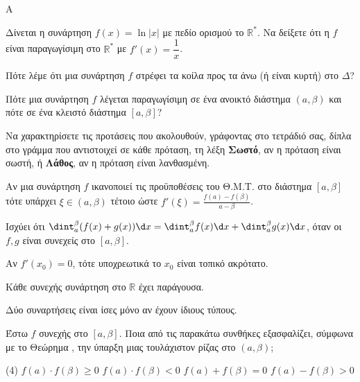 \begin{thema}{A}
\begin{erwthma}
    \item Δίνεται η συνάρτηση $ f(x)=\ln{|x|} $ με πεδίο ορισμού το $ \mathbb{R}^* $. Να δείξετε ότι η $ f $ είναι παραγωγίσιμη στο $ \mathbb{R}^* $ με $ f'(x)=\dfrac{1}{x} $.
    \item Πότε λέμε ότι μια συνάρτηση $f$ στρέφει τα κοίλα προς τα άνω (ή είναι κυρτή) στο $\Delta$?
    \item Πότε μια συνάρτηση $f$ λέγεται παραγωγίσιμη σε ένα ανοικτό διάστημα $(a,\beta)$ και πότε σε ένα κλειστό διάστημα $[a,\beta]$?
    \item Να χαρακτηρίσετε τις προτάσεις που ακολουθούν, γράφοντας στο τετράδιό σας, δίπλα στο γράμμα που αντιστοιχεί σε κάθε πρόταση, τη λέξη \textbf{Σωστό}, αν η πρόταση είναι σωστή, ή \textbf{Λάθος}, αν η πρόταση είναι λανθασμένη.
    \begin{alist}
        \item Αν μια συνάρτηση $f$ ικανοποιεί τις προϋποθέσεις του Θ.Μ.Τ. στο διάστημα $[a,\beta]$ τότε υπάρχει $\xi\in(a,\beta)$ τέτοιο ώστε $f'(\xi)=\frac{f(a)-f(\beta)}{a-\beta}$.
        \item Ισχύει ότι $\dint_{a}^{\beta} (f(x) + g(x)) \d x = \dint_{a}^{\beta} f(x) \d x + \dint_{a}^{\beta} g(x) \d x$, όταν οι $f, g$ είναι συνεχείς στο $[a, \beta]$.
        \item Αν $f'(x_0) = 0$, τότε υποχρεωτικά το $x_0$ είναι τοπικό ακρότατο.
        \item Κάθε συνεχής συνάρτηση στο $\mathbb{R}$ έχει παράγουσα.
        \item Δύο συναρτήσεις είναι ίσες μόνο αν έχουν ίδιους τύπους.
\end{alist}
    \item Έστω $f$ συνεχής στο $[a, \beta]$. Ποια από τις παρακάτω συνθήκες εξασφαλίζει, σύμφωνα με το Θεώρημα , την ύπαρξη μιας τουλάχιστον ρίζας στο $(a, \beta)$;
    \begin{tasks}[label=\let\textdexiakeraia\relax\alph*.](4)
        \task $f(a) \cdot f(\beta) \ge 0$
        \task $f(a) \cdot f(\beta) < 0$
        \task $f(a) + f(\beta) = 0$
        \task $f(a) - f(\beta) > 0$
    \end{tasks}
\end{erwthma}
\end{thema}


